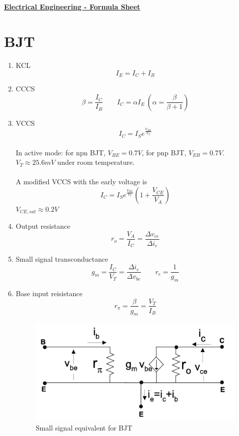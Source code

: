 \documentclass{article}
\begin{document}
\ \\
\ \\
\textbf{\underline{\Large{Electrical Engineering - Formula Sheet}}}\ \\
\section{BJT}
\begin{enumerate}
	\item KCL \[I_{E}=I_{C}+I_{B}\]
	\item CCCS \[\beta = \frac{I_{C}}{I_{B}} \quad \quad I_{C}=\alpha I_{E} \ (\alpha=\frac{\beta}{\beta +1})\]
	\item VCCS \[I_{C}=I_{S}e^{\frac{V_{BE}}{V_{T}}}\]\\In active mode: for npn BJT, $V_{BE}=0.7V$, for pnp BJT, $V_{EB}=0.7V$.  $V_{T}\approx 25.6mV$ under room temperature. \\\\A modified VCCS with the early voltage is  \[I_{C}=I_{S}e^{\frac{V_{BE}}{V_{T}}}(1+\frac{V_{CE}}{V_{A}})\]  $V_{CE,sat}\approx 0.2V$
	\item Output resistance \[r_{o}=\frac{V_{A}}{I_{C}}=\frac{\Delta v_{ce}}{\Delta i_{c}}\]
	\item Small signal transconductance \[g_{m}=\frac{I_{C}}{V_{T}}=\frac{\Delta i_{c}}{\Delta v_{be}}\quad \quad r_{e}=\frac{1}{g_{m}}\]
	\item Base input reisistance \[r_{\pi}=\frac{\beta}{g_{m}}=\frac{V_{T}}{I_{B}}\]
\begin{figure}[H]\centering
\includegraphics[width=.6\textwidth]{bjt_ss}
\caption{Small signal equivalent for BJT}
\end{figure}
\end{enumerate}
\end{document}
